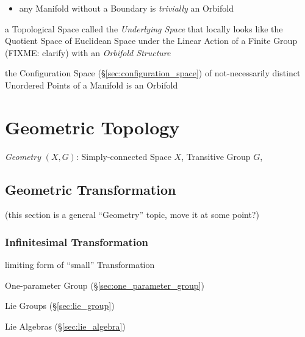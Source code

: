 \begin{itemize}
  \item any Manifold without a Boundary is \emph{trivially} an Orbifold
\end{itemize}

a Topological Space called the \emph{Underlying Space} that locally looks like
the Quotient Space of Euclidean Space under the Linear Action of a Finite Group
(FIXME: clarify) with an \emph{Orbifold Structure}

the Configuration Space (\S\ref{sec:configuration_space}) of not-necessarily
distinct Unordered Points of a Manifold is an Orbifold



\section{Geometric Topology}\label{sec:geometric_topology}

\emph{Geometry} $(X,G)$: Simply-connected Space $X$, Transitive Group $G$,



\subsection{Geometric Transformation}
\label{sec:geometric_transformation}


(this section is a general ``Geometry'' topic, move it at some point?)



\subsubsection{Infinitesimal Transformation}
\label{sec:infinitesimal_transformation}

limiting form of ``small'' Transformation

One-parameter Group (\S\ref{sec:one_parameter_group})

Lie Groups (\S\ref{sec:lie_group})

Lie Algebras (\S\ref{sec:lie_algebra})



